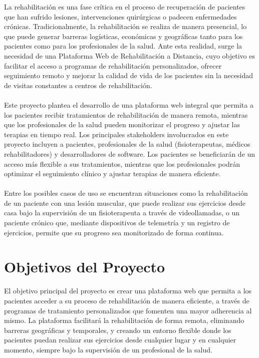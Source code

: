 \documentclass{article}
\begin{document}
La rehabilitación es una fase crítica en el proceso de recuperación de pacientes que han sufrido lesiones, intervenciones quirúrgicas o padecen enfermedades crónicas. Tradicionalmente, la rehabilitación se realiza de manera presencial, lo que puede generar barreras logísticas, económicas y geográficas tanto para los pacientes como para los profesionales de la salud. Ante esta realidad, surge la necesidad de una Plataforma Web de Rehabilitación a Distancia, cuyo objetivo es facilitar el acceso a programas de rehabilitación personalizados, ofrecer seguimiento remoto y mejorar la calidad de vida de los pacientes sin la necesidad de visitas constantes a centros de rehabilitación.
\\
\\
Este proyecto plantea el desarrollo de una plataforma web integral que permita a los pacientes recibir tratamientos de rehabilitación de manera remota, mientras que los profesionales de la salud pueden monitorizar el progreso y ajustar las terapias en tiempo real. Los principales stakeholders involucrados en este proyecto incluyen a pacientes, profesionales de la salud (fisioterapeutas, médicos rehabilitadores) y desarrolladores de software. Los pacientes se beneficiarán de un acceso más flexible a sus tratamientos, mientras que los profesionales podrán optimizar el seguimiento clínico y ajustar terapias de manera eficiente.
\\
\\
Entre los posibles casos de uso se encuentran situaciones como la rehabilitación de un paciente con una lesión muscular, que puede realizar sus ejercicios desde casa bajo la supervisión de un fisioterapeuta a través de videollamadas, o un paciente crónico que, mediante dispositivos de telemetría y un registro de ejercicios, permite que su progreso sea monitorizado de forma continua.


\section{Objetivos del Proyecto}
El objetivo principal del proyecto es crear una plataforma web que permita a los pacientes acceder a su proceso de rehabilitación de manera eficiente, a través de programas de tratamiento personalizados que fomenten una mayor adherencia al mismo. La plataforma facilitará la rehabilitación de forma remota, eliminando barreras geográficas y temporales, y creando un entorno flexible donde los pacientes puedan realizar sus ejercicios desde cualquier lugar y en cualquier momento, siempre bajo la supervisión de un profesional de la salud.
\\
\end{document}
